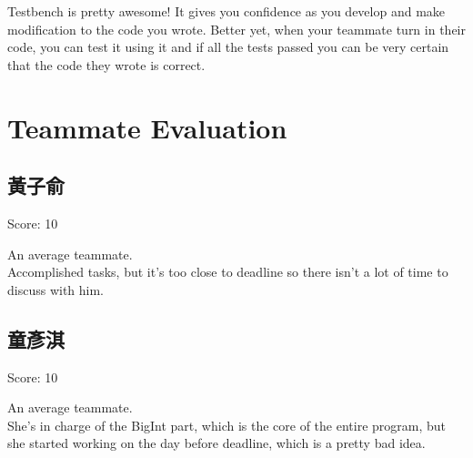 \documentclass[12pt, A4]{article}
\begin{document}
    Testbench is pretty awesome! It gives you confidence as you develop and make modification to the code you wrote. Better yet, when your teammate turn in their code, you can test it using it and if all the tests passed you can be very certain that the code they wrote is correct.
    
    \section{Teammate Evaluation}
    
    \subsection{黃子俞}
    
    Score: 10
    
    An average teammate. \\
    
    Accomplished tasks, but it's too close to deadline so there isn't a lot of time to discuss with him. \\
    
    \subsection{童彥淇}
    
    Score: 10
    
    An average teammate. \\
    
    She's in charge of the BigInt part, which is the core of the entire program, but she started working on the day before deadline, which is a pretty bad idea.\\
	
\end{document}
